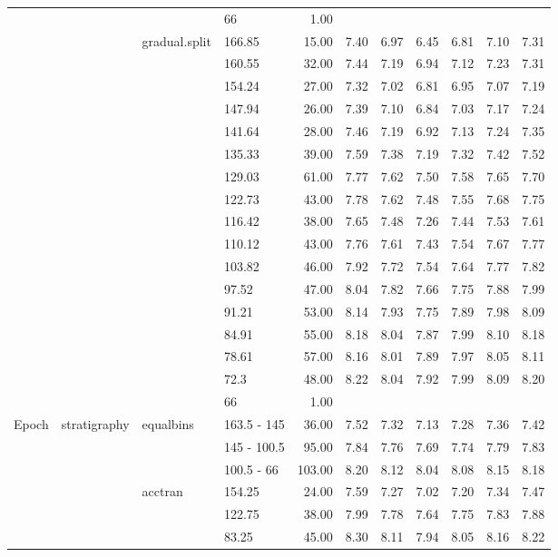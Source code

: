 \begin{longtable}{llllrrrrrrr}
   &  &  & 66 & 1.00 &  &  &  &  &  &  \\ 
   &  & gradual.split & 166.85 & 15.00 & 7.40 & 6.97 & 6.45 & 6.81 & 7.10 & 7.31 \\ 
   &  &  & 160.55 & 32.00 & 7.44 & 7.19 & 6.94 & 7.12 & 7.23 & 7.31 \\ 
   &  &  & 154.24 & 27.00 & 7.32 & 7.02 & 6.81 & 6.95 & 7.07 & 7.19 \\ 
   &  &  & 147.94 & 26.00 & 7.39 & 7.10 & 6.84 & 7.03 & 7.17 & 7.24 \\ 
   &  &  & 141.64 & 28.00 & 7.46 & 7.19 & 6.92 & 7.13 & 7.24 & 7.35 \\ 
   &  &  & 135.33 & 39.00 & 7.59 & 7.38 & 7.19 & 7.32 & 7.42 & 7.52 \\ 
   &  &  & 129.03 & 61.00 & 7.77 & 7.62 & 7.50 & 7.58 & 7.65 & 7.70 \\ 
   &  &  & 122.73 & 43.00 & 7.78 & 7.62 & 7.48 & 7.55 & 7.68 & 7.75 \\ 
   &  &  & 116.42 & 38.00 & 7.65 & 7.48 & 7.26 & 7.44 & 7.53 & 7.61 \\ 
   &  &  & 110.12 & 43.00 & 7.76 & 7.61 & 7.43 & 7.54 & 7.67 & 7.77 \\ 
   &  &  & 103.82 & 46.00 & 7.92 & 7.72 & 7.54 & 7.64 & 7.77 & 7.82 \\ 
   &  &  & 97.52 & 47.00 & 8.04 & 7.82 & 7.66 & 7.75 & 7.88 & 7.99 \\ 
   &  &  & 91.21 & 53.00 & 8.14 & 7.93 & 7.75 & 7.89 & 7.98 & 8.09 \\ 
   &  &  & 84.91 & 55.00 & 8.18 & 8.04 & 7.87 & 7.99 & 8.10 & 8.18 \\ 
   &  &  & 78.61 & 57.00 & 8.16 & 8.01 & 7.89 & 7.97 & 8.05 & 8.11 \\ 
   &  &  & 72.3 & 48.00 & 8.22 & 8.04 & 7.92 & 7.99 & 8.09 & 8.20 \\ 
   &  &  & 66 & 1.00 &  &  &  &  &  &  \\ 
  Epoch & stratigraphy & equalbins & 163.5 - 145 & 36.00 & 7.52 & 7.32 & 7.13 & 7.28 & 7.36 & 7.42 \\ 
   &  &  & 145 - 100.5 & 95.00 & 7.84 & 7.76 & 7.69 & 7.74 & 7.79 & 7.83 \\ 
   &  &  & 100.5 - 66 & 103.00 & 8.20 & 8.12 & 8.04 & 8.08 & 8.15 & 8.18 \\ 
   &  & acctran & 154.25 & 24.00 & 7.59 & 7.27 & 7.02 & 7.20 & 7.34 & 7.47 \\ 
   &  &  & 122.75 & 38.00 & 7.99 & 7.78 & 7.64 & 7.75 & 7.83 & 7.88 \\ 
   &  &  & 83.25 & 45.00 & 8.30 & 8.11 & 7.94 & 8.05 & 8.16 & 8.22 \\ 

\end{longtable}

